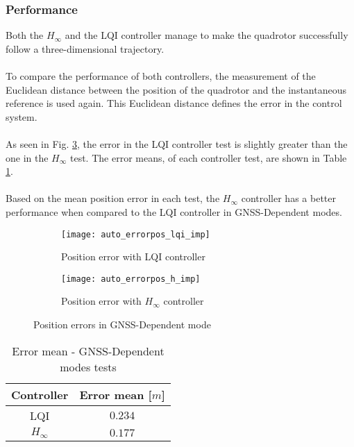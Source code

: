 \subsubsection{Performance}
Both the $H_\infty$ and the LQI controller manage to make the quadrotor successfully follow a three-dimensional trajectory.\\\\
To compare the performance of both controllers, the measurement of the Euclidean distance between the position of the quadrotor and the instantaneous reference is used again. This Euclidean distance defines the error in the control system.
\\\\
As seen in Fig. \ref{fig:auto_errorpos_imp}, the error in the LQI controller test is slightly greater than the one in the $H_\infty$ test. The error means, of each controller test, are shown in Table \ref{tb:error_mean}.
\\\\
Based on the mean position error in each test, the $H_\infty$ controller has a better performance when compared to the LQI controller in GNSS-Dependent modes.
\begin{figure}[H]
\begin{subfigure}{.5\linewidth}
\centering
\texttt{[image: auto\_errorpos\_lqi\_imp]}
\caption{Position error with LQI controller}
\label{fig:auto_errorpos_lqi_imp}
\end{subfigure}%
\begin{subfigure}{.5\linewidth}
\centering
\texttt{[image: auto\_errorpos\_h\_imp]}
\caption{Position error with $H_\infty$ controller}
\label{fig:auto_errorpos_h_imp}
\end{subfigure}
\caption{Position errors in GNSS-Dependent mode}
\label{fig:auto_errorpos_imp}
\end{figure}
\begin{table}[H]
\small
\begin{center}
\caption{Error mean - GNSS-Dependent modes tests}\label{tb:error_mean}
\begin{tabular}{c|c}\hline
\rule{0pt}{3ex} Controller & Error mean [$m$] \\\hline\hline
\rule{0pt}{3ex} 
LQI  & $0.234$ \\[3px] \hline\rule{0pt}{3ex}
$H_\infty$ & $0.177$ \\[3px] \hline\hline
\end{tabular}
\end{center}
\end{table}



